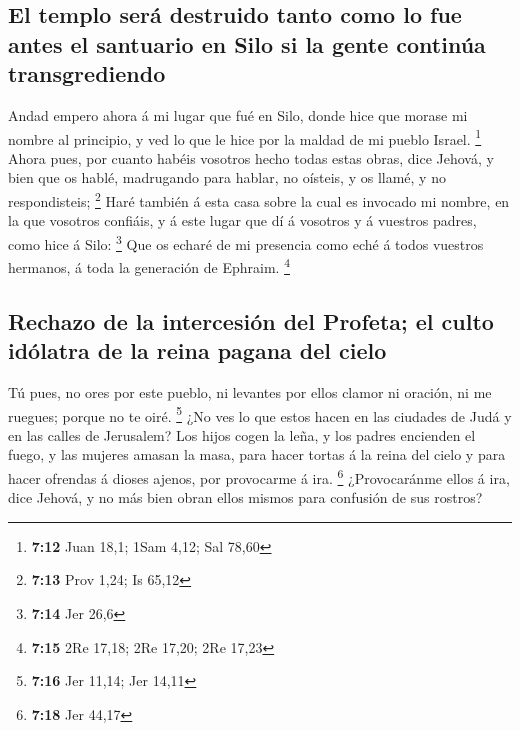 \hypertarget{el-templo-seruxe1-destruido-tanto-como-lo-fue-antes-el-santuario-en-silo-si-la-gente-continuxfaa-transgrediendo}{%
\subsection{El templo será destruido tanto como lo fue antes el
santuario en Silo si la gente continúa
transgrediendo}\label{el-templo-seruxe1-destruido-tanto-como-lo-fue-antes-el-santuario-en-silo-si-la-gente-continuxfaa-transgrediendo}}

 Andad empero ahora á mi lugar que fué en Silo, donde
hice que morase mi nombre al principio, y ved lo que le hice por la
maldad de mi pueblo Israel. \footnote{\textbf{7:12} Juan 18,1; 1Sam
  4,12; Sal 78,60}  Ahora pues, por cuanto habéis
vosotros hecho todas estas obras, dice Jehová, y bien que os hablé,
madrugando para hablar, no oísteis, y os llamé, y no respondisteis;
\footnote{\textbf{7:13} Prov 1,24; Is 65,12}  Haré
también á esta casa sobre la cual es invocado mi nombre, en la que
vosotros confiáis, y á este lugar que dí á vosotros y á vuestros padres,
como hice á Silo: \footnote{\textbf{7:14} Jer 26,6}  Que
os echaré de mi presencia como eché á todos vuestros hermanos, á toda la
generación de Ephraim. \footnote{\textbf{7:15} 2Re 17,18; 2Re 17,20; 2Re
  17,23}

\hypertarget{rechazo-de-la-intercesiuxf3n-del-profeta-el-culto-iduxf3latra-de-la-reina-pagana-del-cielo}{%
\subsection{Rechazo de la intercesión del Profeta; el culto idólatra de
la reina pagana del
cielo}\label{rechazo-de-la-intercesiuxf3n-del-profeta-el-culto-iduxf3latra-de-la-reina-pagana-del-cielo}}

 Tú pues, no ores por este pueblo, ni levantes por ellos
clamor ni oración, ni me ruegues; porque no te oiré. \footnote{\textbf{7:16}
  Jer 11,14; Jer 14,11}  ¿No ves lo que estos hacen en
las ciudades de Judá y en las calles de Jerusalem?  Los
hijos cogen la leña, y los padres encienden el fuego, y las mujeres
amasan la masa, para hacer tortas á la reina del cielo y para hacer
ofrendas á dioses ajenos, por provocarme á ira. \footnote{\textbf{7:18}
  Jer 44,17}  ¿Provocaránme ellos á ira, dice Jehová, y
no más bien obran ellos mismos para confusión de sus rostros?

